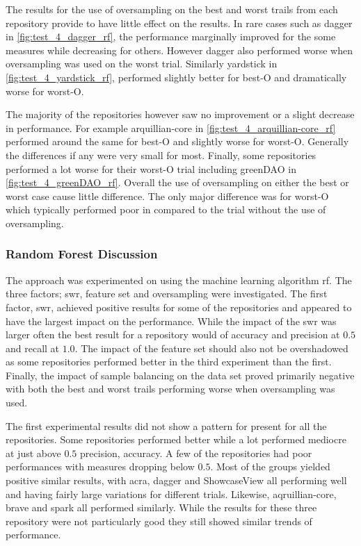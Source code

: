 The results for the use of oversampling on the best and worst trails from each repository provide to have little effect on the results. In rare cases such as dagger in \autoref{fig:test_4_dagger_rf}, the performance marginally improved for the some measures while decreasing for others. However dagger also performed worse when oversampling was used on the worst trial. Similarly yardstick in \autoref{fig:test_4_yardstick_rf}, performed slightly better for best-O and dramatically worse for worst-O.

The majority of the repositories however saw no improvement or a slight decrease in performance. For example arquillian-core in \autoref{fig:test_4_arquillian-core_rf} performed around the same for best-O and slightly worse for worst-O. Generally the differences if any were very small for most. Finally, some repositories performed a lot worse for their worst-O trial including greenDAO in \autoref{fig:test_4_greenDAO_rf}. Overall the use of oversampling on either the best or worst case cause little difference. The only major difference was for worst-O which typically performed poor in compared to the trial without the use of oversampling.

\subsubsection{Random Forest Discussion}
\label{subsec:rf_discussion}

The approach was experimented on using the machine learning algorithm \gls{rf}. The three factors; \gls{swr}, feature set and oversampling were investigated. The first factor, \gls{swr}, achieved positive results for some of the repositories and appeared to have the largest impact on the performance. While the impact of the \gls{swr} was larger often the best result for a repository would of accuracy and precision at $0.5$ and recall at $1.0$. The impact of the feature set should also not be overshadowed as some repositories performed better in the third experiment than the first. Finally, the impact of sample balancing on the data set proved primarily negative with both the best and worst trails performing worse when oversampling was used.

The first experimental results did not show a pattern for present for all the repositories. Some repositories performed better while a lot performed mediocre at just above $0.5$ precision, accuracy. A few of the repositories had poor performances with measures dropping below $0.5$. Most of the groups yielded positive similar results, with acra, dagger and ShowcaseView all performing well and having fairly large variations for different trials. Likewise, aqruillian-core, brave and spark all performed similarly. While the results for these three repository were not particularly good they still showed similar trends of performance.

